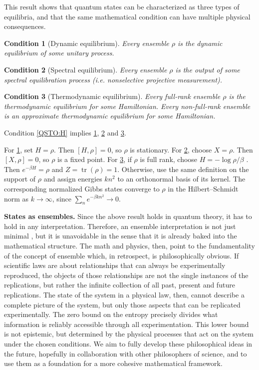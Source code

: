 \documentclass[entropy,article,submit,moreauthors]{Definitions/mdpi}
\newtheorem{condth}{Condition}
\renewcommand*{\thecondth}{\Roman{condth}}
\newenvironment{condition}[2][]{\renewcommand{\thecondth}{#2}\begin{condth}[#1]\label{#2}}{\end{condth}\renewcommand{\thecondth}{\Roman{condth}}}
\DeclareMathOperator{\tr}{tr}
\begin{document}
This result shows that quantum states can be characterized as three types of equilibria, and that the same mathematical condition can have multiple physical consequences.

\begin{condition}[Dynamic equilibrium]{EE-DYN}
	Every ensemble $\rho$ is the dynamic equilibrium of some unitary process.
\end{condition}

\begin{condition}[Spectral equilibrium]{EE-MEAS}
	Every ensemble $\rho$ is the output of some spectral equilibration process (i.e. nonselective projective measurement).
\end{condition}

\begin{condition}[Thermodynamic equilibrium]{EE-THER}
	Every full-rank ensemble $\rho$ is the thermodynamic equilibrium for some Hamiltonian. Every non-full-rank ensemble is an approximate thermodynamic equilibrium for some Hamiltonian.
\end{condition}

\begin{Theorem}
	Condition \ref{QSTO:H} implies \ref{EE-DYN}, \ref{EE-MEAS} and \ref{EE-THER}.
\end{Theorem}

For \ref{EE-DYN}, set $H=\rho$. Then $[H,\rho] = 0$, so $\rho$ is stationary. For \ref{EE-MEAS}, choose $X = \rho$. Then $[X,\rho] = 0$, so $\rho$ is a fixed point. For \ref{EE-THER}, if $\rho$ is full rank, choose $H=-\log\rho/\beta$ \cite{Wilming2017}. Then $e^{-\beta H}=\rho$ and $Z=\tr(\rho)=1$. Otherwise, use the same definition on the support of $\rho$ and assign energies $kn^2$ to an orthonormal basis of its kernel. The corresponding normalized Gibbs states converge to $\rho$ in the Hilbert--Schmidt norm as $k\to\infty$, since $\sum_n e^{-\beta kn^2}\to0$.

\textbf{States as ensembles.} Since the above result holds in quantum theory, it has to hold in any interpretation. Therefore, an ensemble interpretation is not just minimal \cite{Ballentine1970,HomeWhitaker1992}, but it is unavoidable in the sense that it is already baked into the mathematical structure. The math and physics, then, point to the fundamentality of the concept of ensemble which, in retrospect, is philosophically obvious. If scientific laws are about relationships that can always be experimentally reproduced, the objects of those relationships are not the single instances of the replications, but rather the infinite collection of all past, present and future replications. The state of the system in a physical law, then, cannot describe a complete picture of the system, but only those aspects that can be replicated experimentally. The zero bound on the entropy precisely divides what information is reliably accessible through all experimentation. This lower bound is not epistemic, but determined by the physical processes that act on the system under the chosen conditions. We aim to fully develop these philosophical ideas in the future, hopefully in collaboration with other philosophers of science, and to use them as a foundation for a more cohesive mathematical framework.
\end{document}
